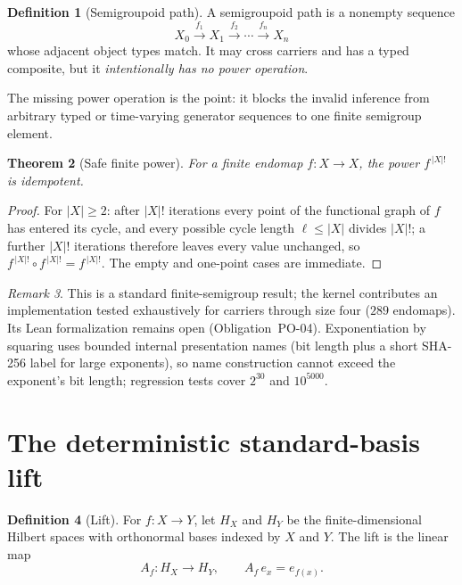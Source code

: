 \documentclass[11pt]{amsart}
\newtheorem{theorem}{Theorem}[section]
\theoremstyle{definition}
\newtheorem{definition}[theorem]{Definition}
\theoremstyle{remark}
\newtheorem{remark}[theorem]{Remark}
\begin{document}
\begin{definition}[Semigroupoid path]
A semigroupoid path is a nonempty sequence
\[
X_0 \xrightarrow{f_1} X_1 \xrightarrow{f_2} \cdots \xrightarrow{f_n} X_n
\]
whose adjacent object types match. It may cross carriers and has a typed composite, but it \emph{intentionally has no power operation}.
\end{definition}

The missing power operation is the point: it blocks the invalid inference from arbitrary typed or time-varying generator sequences to one finite semigroup element.

\begin{theorem}[Safe finite power]\label{thm:factorial}
For a finite endomap $f : X \to X$, the power $f^{\,|X|!}$ is idempotent.
\end{theorem}

\begin{proof}
For $|X| \ge 2$: after $|X|!$ iterations every point of the functional graph of $f$ has entered its cycle, and every possible cycle length $\ell \le |X|$ divides $|X|!$; a further $|X|!$ iterations therefore leaves every value unchanged, so $f^{\,|X|!} \circ f^{\,|X|!} = f^{\,|X|!}$. The empty and one-point cases are immediate.
\end{proof}

\begin{remark}
This is a standard finite-semigroup result; the kernel contributes an implementation tested exhaustively for carriers through size four ($289$ endomaps). Its Lean formalization remains open (Obligation~PO-04). Exponentiation by squaring uses bounded internal presentation names (bit length plus a short SHA-256 label for large exponents), so name construction cannot exceed the exponent's bit length; regression tests cover $2^{30}$ and $10^{5000}$.
\end{remark}

\section{The deterministic standard-basis lift}

\begin{definition}[Lift]
For $f : X \to Y$, let $H_X$ and $H_Y$ be the finite-dimensional Hilbert spaces with orthonormal bases indexed by $X$ and $Y$. The lift is the linear map
\[
A_f : H_X \to H_Y, \qquad A_f\, e_x = e_{f(x)} .
\]
\end{definition}
\end{document}
